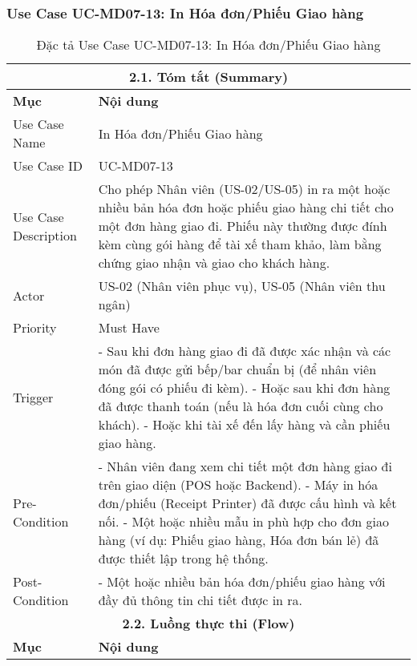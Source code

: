 \subsubsection{Use Case UC-MD07-13: In Hóa đơn/Phiếu Giao hàng}
\begin{longtable}{|m{4cm}|p{11cm}|}
\caption{Đặc tả Use Case UC-MD07-13: In Hóa đơn/Phiếu Giao hàng} \label{tab:uc_md07_13_final_full} \\
\hline
\multicolumn{2}{|c|}{\textbf{2.1. Tóm tắt (Summary)}} \\
\hline
\textbf{Mục} & \textbf{Nội dung} \\
\hline
\endhead %
\hline
\endfoot %
\hline
\endlastfoot %
Use Case Name & In Hóa đơn/Phiếu Giao hàng \\
\hline
Use Case ID & UC-MD07-13 \\
\hline
Use Case Description & Cho phép Nhân viên (US-02/US-05) in ra một hoặc nhiều bản hóa đơn hoặc phiếu giao hàng chi tiết cho một đơn hàng giao đi. Phiếu này thường được đính kèm cùng gói hàng để tài xế tham khảo, làm bằng chứng giao nhận và giao cho khách hàng. \\
\hline
Actor & US-02 (Nhân viên phục vụ), US-05 (Nhân viên thu ngân) \\
\hline
Priority & Must Have \\
\hline
Trigger & - Sau khi đơn hàng giao đi đã được xác nhận và các món đã được gửi bếp/bar chuẩn bị (để nhân viên đóng gói có phiếu đi kèm). \newline - Hoặc sau khi đơn hàng đã được thanh toán (nếu là hóa đơn cuối cùng cho khách). \newline - Hoặc khi tài xế đến lấy hàng và cần phiếu giao hàng. \\
\hline
Pre-Condition & - Nhân viên đang xem chi tiết một đơn hàng giao đi trên giao diện (POS hoặc Backend). \newline - Máy in hóa đơn/phiếu (Receipt Printer) đã được cấu hình và kết nối. \newline - Một hoặc nhiều mẫu in phù hợp cho đơn giao hàng (ví dụ: Phiếu giao hàng, Hóa đơn bán lẻ) đã được thiết lập trong hệ thống. \\
\hline
Post-Condition & - Một hoặc nhiều bản hóa đơn/phiếu giao hàng với đầy đủ thông tin chi tiết được in ra. \\
\hline
\multicolumn{2}{|c|}{\textbf{2.2. Luồng thực thi (Flow)}} \\
\hline
\textbf{Mục} & \textbf{Nội dung} \\

\end{longtable}

